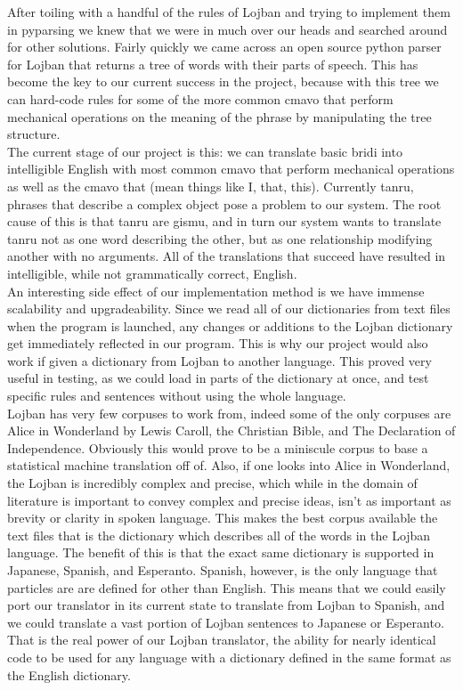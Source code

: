 \documentclass[11pt,letterpaper]{article}
\begin{document}
	After toiling with a handful of the rules of Lojban and trying to implement them in pyparsing we knew that we were in much over our heads and searched around for other solutions. Fairly quickly we came across an open source python parser for Lojban that returns a tree of words with their parts of speech. This has become the key to our current success in the project, because with this tree we can hard-code rules for some of the more common cmavo that perform mechanical operations on the meaning of the phrase by manipulating the tree structure.\\

	The current stage of our project is this: we can translate basic bridi into intelligible English with most common cmavo that perform mechanical operations as well as the cmavo that (mean things like I, that, this). Currently tanru, phrases that describe a complex object pose a problem to our system. The root cause of this is that tanru are gismu, and in turn our system wants to translate tanru not as one word describing the other, but as one relationship modifying another with no arguments. All of the translations that succeed have resulted in intelligible, while not grammatically correct, English.\\
	
	An interesting side effect of our implementation method is we have immense scalability and upgradeability.  Since we read all of our dictionaries from text files when the program is launched, any changes or additions to the Lojban dictionary get immediately reflected in our program.  This is why our project would also work if given a dictionary from Lojban to another language.  This proved very useful in testing, as we could load in parts of the dictionary at once, and test specific rules and sentences without using the whole language.  \\

	Lojban has very few corpuses to work from, indeed some of the only corpuses are Alice in Wonderland by Lewis Caroll, the Christian Bible, and The Declaration of Independence. Obviously this would prove to be a miniscule corpus to base a statistical machine translation off of. Also, if one looks into Alice in Wonderland, the Lojban is incredibly complex and precise, which while in the domain of literature is important to convey complex and precise ideas, isn’t as important as brevity or clarity in spoken language. This makes the best corpus available the text files that is the dictionary which describes all of the words in the Lojban language. The benefit of this is that the exact same dictionary is supported in Japanese, Spanish, and Esperanto. Spanish, however, is the only language that particles are are defined for other than English. This means that we could easily port our translator in its current state to translate from Lojban to Spanish, and we could translate a vast portion of Lojban sentences to Japanese or Esperanto. That is the real power of our Lojban translator, the ability for nearly identical code to be used for any language with a dictionary defined in the same format as the English dictionary.\\
\end{document}
